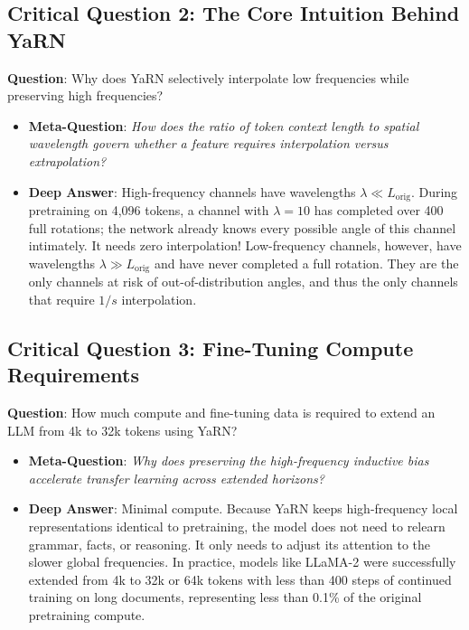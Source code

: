 \documentclass[11pt,a4paper]{article}
\theoremstyle{definition}
\begin{document}
\subsection{\textbf{Critical Question 2: The Core Intuition Behind YaRN}}
\textbf{Question}: Why does YaRN selectively interpolate low frequencies while preserving high frequencies?
\begin{itemize}
    \item \textbf{Meta-Question}: \emph{How does the ratio of token context length to spatial wavelength govern whether a feature requires interpolation versus extrapolation?}
    \item \textbf{Deep Answer}: High-frequency channels have wavelengths $\lambda \ll L_{\text{orig}}$. During pretraining on 4,096 tokens, a channel with $\lambda = 10$ has completed over 400 full rotations; the network already knows every possible angle of this channel intimately. It needs zero interpolation! Low-frequency channels, however, have wavelengths $\lambda \gg L_{\text{orig}}$ and have never completed a full rotation. They are the only channels at risk of out-of-distribution angles, and thus the only channels that require $1/s$ interpolation.
\end{itemize}

\subsection{\textbf{Critical Question 3: Fine-Tuning Compute Requirements}}
\textbf{Question}: How much compute and fine-tuning data is required to extend an LLM from 4k to 32k tokens using YaRN?
\begin{itemize}
    \item \textbf{Meta-Question}: \emph{Why does preserving the high-frequency inductive bias accelerate transfer learning across extended horizons?}
    \item \textbf{Deep Answer}: Minimal compute. Because YaRN keeps high-frequency local representations identical to pretraining, the model does not need to relearn grammar, facts, or reasoning. It only needs to adjust its attention to the slower global frequencies. In practice, models like LLaMA-2 were successfully extended from 4k to 32k or 64k tokens with less than 400 steps of continued training on long documents, representing less than 0.1\% of the original pretraining compute.
\end{itemize}
\end{document}
